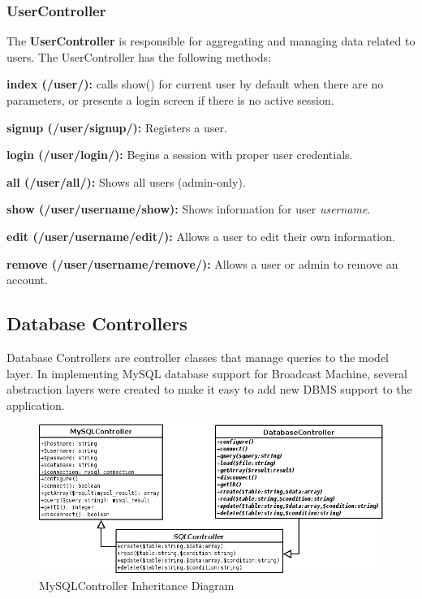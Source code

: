 \documentclass[a4paper,12pt]{report}
\begin{document}
\subsubsection{UserController}
The \textbf{UserController} is responsible for aggregating and managing data related to users. The UserController has the following methods:
\begin{description}
\item{\textbf{index (/user/): } calls show() for current user by default when there are no parameters, or presents a login screen if there is no active session.}
\item{\textbf{signup (/user/signup/): } Registers a user.}
\item{\textbf{login (/user/login/): } Begins a session with proper user credentials.}
\item{\textbf{all (/user/all/): } Shows all users (admin-only).}
\item{\textbf{show (/user/username/show): } Shows information for user \textit{username}.}
\item{\textbf{edit (/user/username/edit/): } Allows a user to edit their own information.}
\item{\textbf{remove (/user/username/remove/): } Allows a user or admin to remove an account.} \\
\end{description}

\subsection*{Database Controllers}
Database Controllers are controller classes that manage queries to the model layer. In implementing MySQL database support for Broadcast Machine, several abstraction layers were created to make it easy to add new DBMS support to the application.
\begin{figure}[h]
\begin{center}
\includegraphics[scale=0.5]{./images/mysql.png}
\end{center}
\caption{MySQLController Inheritance Diagram}
\end{figure}
\end{document}
